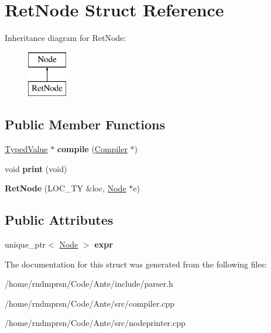 \hypertarget{structRetNode}{}\section{Ret\+Node Struct Reference}
\label{structRetNode}
Inheritance diagram for Ret\+Node\+:\begin{figure}[H]
\begin{center}
\leavevmode
\includegraphics[height=2.000000cm]{structRetNode}
\end{center}
\end{figure}
\subsection*{Public Member Functions}
\begin{DoxyCompactItemize}
\item 
\mbox{\label{structRetNode_acadca5e50e51de4d100afecc35fd1c18}} 
\hyperlink{structTypedValue}{Typed\+Value} $\ast$ {\bfseries compile} (\hyperlink{structante_1_1Compiler}{Compiler} $\ast$)
\item 
\mbox{\label{structRetNode_a15d1f5b8f2793a261162396b68af58bf}} 
void {\bfseries print} (void)
\item 
\mbox{\label{structRetNode_a7dd6b9c547398e9ea18124ac9cbcdc17}} 
{\bfseries Ret\+Node} (L\+O\+C\+\_\+\+TY \&loc, \hyperlink{structNode}{Node} $\ast$e)
\end{DoxyCompactItemize}
\subsection*{Public Attributes}
\begin{DoxyCompactItemize}
\item 
\mbox{\label{structRetNode_ada00e6cc35027a85d5b8283a5c30799e}} 
unique\+\_\+ptr$<$ \hyperlink{structNode}{Node} $>$ {\bfseries expr}
\end{DoxyCompactItemize}


The documentation for this struct was generated from the following files\+:\begin{DoxyCompactItemize}
\item 
/home/rndmprsn/\+Code/\+Ante/include/parser.\+h\item 
/home/rndmprsn/\+Code/\+Ante/src/compiler.\+cpp\item 
/home/rndmprsn/\+Code/\+Ante/src/nodeprinter.\+cpp\end{DoxyCompactItemize}
